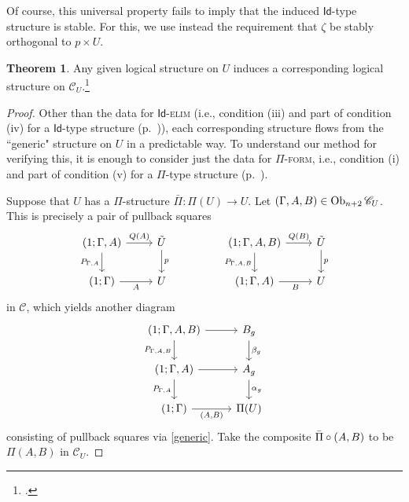 \documentclass[10pt,letterpaper,cm]{nupset}
\theoremstyle{definition}
\theoremstyle{theorem}
\newtheorem{theorem}[definition]{Theorem}
\theoremstyle{remark}
\DeclareMathOperator{\ob}{Ob}
\newcommand{\id}{\mathsf{Id}}
\newcommand{\0}{\mathbf{0}}
\newcommand{\1}{\mathbf{1}}
\newcommand{\2}{\mathbf{2}}
\renewcommand{\c}{\mathscr{C}}
\begin{document}
Of course, this universal property fails to imply that the induced $\id$-type structure  is stable. For this, we use instead the requirement that $\zeta$ be stably orthogonal to $p \times U$.

\begin{theorem}\label{univlog}
Any given logical structure on $U$ induces a corresponding logical structure on $\c_U$.\footnote{\cite[Theorem 1.4.15]{KL}.}
\end{theorem}
\begin{proof}
Other than the data for $\id$-\textsc{elim} (i.e., condition (iii) and part of condition (iv) for a $\id$-type structure (p.~\pageref{idtype})), each corresponding structure flows from the ``generic" structure on $U$ in a predictable way. To understand our method for verifying this, it is enough to consider just the data for $\Pi$-\textsc{form}, i.e., condition (i) and part of condition (v) for a $\Pi$-type structure (p.~\pageref{pitype}).

\smallskip

Suppose that $U$ has a $\Pi$-structure $\bar{\Pi}: \Pi(U)\to U$. Let $\mleft(\Gamma, A, B\mright)\in \ob_{n+2}{\c_U}$. This is precisely a pair of pullback squares
\[
\begin{tikzcd}
{\mleft(1; \Gamma, A\mright)} \arrow[d, "{P_{\Gamma, A}}"'] \arrow[r, "Q(A)"] & \tilde{U} \arrow[d, "p"] &  & {\mleft(1; \Gamma, A, B\mright)} \arrow[d, "{P_{\Gamma, A, B}}"'] \arrow[r, "Q(B)"] & \tilde{U} \arrow[d, "p"] \\
\mleft(1;\Gamma\mright) \arrow[r, "A"']                                       & U                        &  & {\mleft(1; \Gamma, A\mright)} \arrow[r, "B"']                                       & U                       
\end{tikzcd}
\] in $\c$, which yields another diagram
\[
\begin{tikzcd}
{\mleft(1; \Gamma, A, B\mright)} \arrow[d, "{P_{\Gamma, A, B}}"'] \arrow[r] & B_g \arrow[d, "\beta_g"]  \\
{\mleft(1; \Gamma, A\mright)} \arrow[r] \arrow[d, "{P_{\Gamma, A}}"']       & A_g \arrow[d, "\alpha_g"] \\
\mleft(1; \Gamma\mright) \arrow[r, "{\mleft(A, B\mright)}"']       & \Pi(U)                   
\end{tikzcd}
\]  consisting of pullback squares via \cref{generic}. Take the composite $\bar{\Pi} \circ \mleft(A, B\mright)$ to be $\Pi(A,B)$ in $\c_U$. 

\smallskip


\end{proof}
\end{document}
